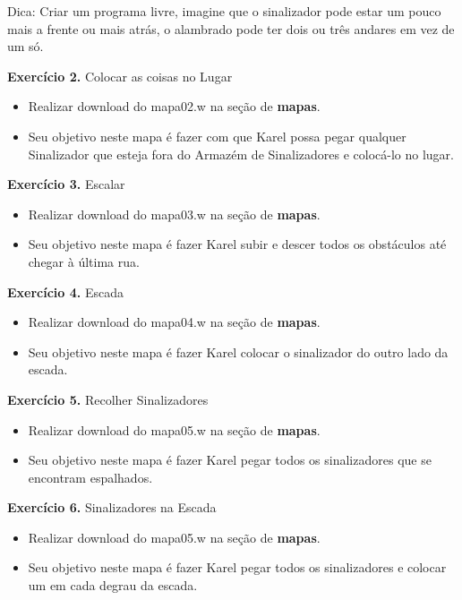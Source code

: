 \documentclass[a4paper,11pt]{article}
\begin{document}
Dica: Criar um programa livre, imagine que o sinalizador pode estar um pouco mais a
frente ou mais atrás, o alambrado pode ter dois ou três andares em vez de um só.

\textbf{Exercício 2.} Colocar as coisas no Lugar \vspace{-1em}
\begin{itemize}[nolistsep]
	\item Realizar download do mapa02.w na seção de \textbf{mapas}.
	\item Seu objetivo neste mapa é fazer com que Karel possa pegar qualquer Sinalizador que esteja fora do Armazém de Sinalizadores e colocá-lo no lugar.
\end{itemize}
	
\textbf{Exercício 3.} Escalar \vspace{-1em}
\begin{itemize}[nolistsep]
	\item Realizar download do mapa03.w na seção de \textbf{mapas}.
	\item Seu objetivo neste mapa é fazer Karel subir e descer todos os obstáculos até
	chegar à última rua.
\end{itemize}

\textbf{Exercício 4.} Escada \vspace{-1em}
\begin{itemize}[nolistsep]
	\item Realizar download do mapa04.w na seção de \textbf{mapas}.
	\item Seu objetivo neste mapa é fazer Karel colocar o sinalizador do outro lado da escada.
\end{itemize}

\textbf{Exercício 5.} Recolher Sinalizadores \vspace{-1em}
\begin{itemize}[nolistsep]
	\item Realizar download do mapa05.w na seção de \textbf{mapas}.
	\item Seu objetivo neste mapa é fazer Karel pegar todos os sinalizadores que se
	encontram espalhados.
\end{itemize}

\textbf{Exercício 6.} Sinalizadores na Escada \vspace{-1em}
\begin{itemize}[nolistsep]
	\item Realizar download do mapa05.w na seção de \textbf{mapas}.
	\item Seu objetivo neste mapa é fazer Karel pegar todos os sinalizadores e colocar
	um em cada degrau da escada.
\end{itemize}
\end{document}
